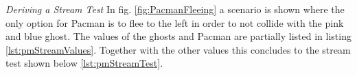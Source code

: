 \emph{Deriving a Stream Test} \newline
In fig. \ref{fig:PacmanFleeing} a scenario is shown where the only option for Pacman is to flee to the left in order to not collide with the pink and blue ghost. The values of the ghosts and Pacman are partially listed in listing \ref{lst:pmStreamValues}. Together with the other values this concludes to the stream test shown below \ref{lst:pmStreamTest}.
\begin{figure}[!h]
	\centering

\end{figure}
